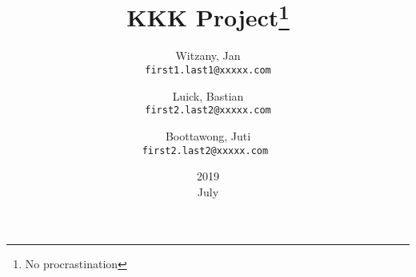 \documentclass{article}
\title{KKK Project\thanks{No procrastination}}
\date{2019\\ July}
\author{
  Witzany, Jan\\
  \texttt{first1.last1@xxxxx.com}
  \and
  Luick, Bastian\\
  \texttt{first2.last2@xxxxx.com}
  \and
  Boottawong, Juti\\
  \texttt{first2.last2@xxxxx.com	}
}
\begin{document}
\begin{titlepage}
\maketitle

\end{titlepage}
\tableofcontents						%

\vspace{2cm} %
 


























  
\end{document}
